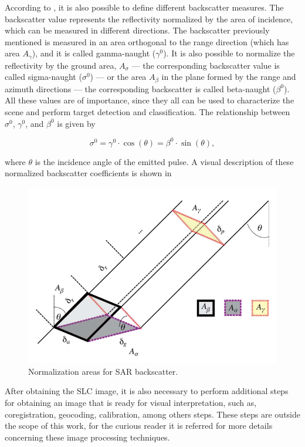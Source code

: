 According to \cite{Raney,Small}, it is also possible to define different backscatter measures. The backscatter value represents the reflectivity normalized by the area of incidence, which can be measured in different directions. The backscatter previously mentioned is measured in an area orthogonal to the range direction (which has area $A_\gamma$), and it is called gamma-naught ($\gamma^0$). It is also possible to normalize the reflectivity by the ground area, $A_\sigma$ --- the corresponding backscatter value is called sigma-naught ($\sigma^0$) --- or the area $A_\beta$ in the plane formed by the range and azimuth directions --- the corresponding backscatter is called beta-naught ($\beta^0$). All these values are of importance, since they all can be used to characterize the scene and perform target detection and classification. The relationship between $\sigma^0$, $\gamma^0$, and $\beta^0$ is given by

\begin{equation}
    \sigma^0 = \gamma^0 \cdot \cos(\theta) = \beta^0 \cdot \sin(\theta),
\end{equation}

\noindent
where $\theta$ is the incidence angle of the emitted pulse. A visual description of these normalized backscatter coefficients is shown in 

\begin{figure}[H]
    \centering
    \includegraphics[width=0.8\linewidth]{Cap1-Bib-Review/retang.png}
    \caption{Normalization areas for SAR backscatter. \cite{Small}}
    \label{fig:normalization_areas}
\end{figure}

After obtaining the SLC image, it is also necessary to perform additional steps for obtaining an image that is ready for visual interpretation, such as, coregistration, geocoding, calibration, among others steps. These steps are outside the scope of this work, for the curious reader it is referred \cite{Alberto} for more details concerning these image processing techniques.


